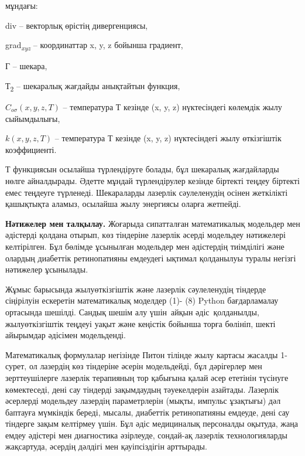 \begin{multicols}{2}
мұндағы:

div -- векторлық өрістің дивергенциясы,

grad\emph{\textsubscript{xyz}} -- координаттар x, y, z бойынша градиент,

Г -- шекара,

Т\textsubscript{2} -- шекаралық жағдайды анықтайтын функция,

\(C_{o\sigma}(x,y,z,T)\) -- температура Т кезінде (x, y, z) нүктесіндегі
көлемдік жылу сыйымдылығы,

\(k(x,y,z,T)\) -- температура Т кезінде (x, y, z) нүктесіндегі жылу
өткізгіштік коэффициенті.

Т функциясын осылайша түрлендіруге болады, бұл шекаралық жағдайларды
нөлге айналдырады. Әдетте мұндай түрлендірулер кезінде біртекті теңдеу
біртекті емес теңдеуге түрленеді. Шекараларды лазерлік сәулеленудің
осінен жеткілікті қашықтықта аламыз, осылайша жылу энергиясы оларға
жетпейді.

{\bfseries Нәтижелер мен талқылау.} Жоғарыда сипатталған математикалық
модельдер мен әдістерді қолдана отырып, көз тіндеріне лазерлік әсерді
модельдеу нәтижелері келтірілген. Бұл бөлімде ұсынылған модельдер мен
әдістердің тиімділігі және олардың диабеттік ретинопатияны емдеудегі
ықтимал қолданылуы туралы негізгі нәтижелер ұсынылады.

Жұмыс барысында жылуөткізгіштік және лазерлік сәулеленудің тіндерде
сіңірілуін ескеретін математикалық моделдер (1)- (8) Python
бағдарламалау ортасында шешілді. Сандық шешім алу үшін~айқын
әдіс~қолданылды, жылуөткізгіштік теңдеуі уақыт және кеңістік бойынша
торға бөлініп, шекті айырымдар әдісімен модельденді.

Математикалық формулалар негізінде Питон тілінде жылу картасы жасалды
1-сурет, ол лазердің көз тіндеріне әсерін модельдейді, бұл дәрігерлер
мен зерттеушілерге лазерлік терапияның тор қабығына қалай әсер ететінін
түсінуге көмектеседі, дені сау тіндерді зақымдаудың тәуекелдерін
азайтады. Лазерлік әсерлерді модельдеу лазердің параметрлерін (мықты,
импульс ұзақтығы) дәл баптауға мүмкіндік береді, мысалы, диабеттік
ретинопатияны емдеуде, дені сау тіндерге зақым келтірмеу үшін. Бұл әдіс
медициналық персоналды оқытуда, жаңа емдеу әдістері мен диагностика
әзірлеуде, сондай-ақ лазерлік технологияларды жақсартуда, әсердің
дәлдігі мен қауіпсіздігін арттырады.
\end{multicols}


